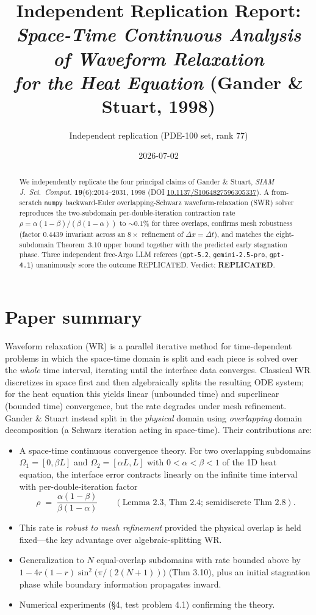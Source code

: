\documentclass[11pt]{article}
\title{Independent Replication Report:\\
\emph{Space-Time Continuous Analysis of Waveform Relaxation\\
for the Heat Equation} (Gander \& Stuart, 1998)}
\author{Independent replication (PDE-100 set, rank 77)}
\date{2026-07-02}
\begin{document}
\maketitle

\begin{abstract}
We independently replicate the four principal claims of Gander \& Stuart,
\emph{SIAM J.\ Sci.\ Comput.} \textbf{19}(6):2014--2031, 1998
(DOI \href{https://doi.org/10.1137/S1064827596305337}{10.1137/S1064827596305337}).
A from-scratch \texttt{numpy} backward-Euler overlapping-Schwarz waveform-relaxation (SWR)
solver reproduces the two-subdomain per-double-iteration contraction rate
$\rho = \alpha(1-\beta)/(\beta(1-\alpha))$ to $\sim 0.1\%$ for three overlaps,
confirms mesh robustness (factor $0.4439$ invariant across an $8\times$ refinement of
$\Delta x=\Delta t$), and matches the eight-subdomain Theorem~3.10 upper bound together
with the predicted early stagnation phase. Three independent free-Argo LLM referees
(\texttt{gpt-5.2}, \texttt{gemini-2.5-pro}, \texttt{gpt-4.1}) unanimously score the
outcome REPLICATED. Verdict: \textbf{REPLICATED}.
\end{abstract}

\section{Paper summary}
Waveform relaxation (WR) is a parallel iterative method for time-dependent problems
in which the space-time domain is split and each piece is solved over the
\emph{whole} time interval, iterating until the interface data converges. Classical
WR discretizes in space first and then algebraically splits the resulting ODE system;
for the heat equation this yields linear (unbounded time) and superlinear (bounded time)
convergence, but the rate degrades under mesh refinement. Gander \& Stuart instead
split in the \emph{physical} domain using \emph{overlapping} domain decomposition
(a Schwarz iteration acting in space-time). Their contributions are:
\begin{itemize}
\item A space-time continuous convergence theory. For two overlapping subdomains
$\Omega_1=[0,\beta L]$ and $\Omega_2=[\alpha L, L]$ with $0<\alpha<\beta<1$ of the 1D
heat equation, the interface error contracts linearly on the infinite time interval
with per-double-iteration factor
\[
\rho \;=\; \frac{\alpha(1-\beta)}{\beta(1-\alpha)}
\qquad (\text{Lemma 2.3, Thm 2.4; semidiscrete Thm 2.8}).
\]
\item This rate is \emph{robust to mesh refinement} provided the physical overlap is
held fixed---the key advantage over algebraic-splitting WR.
\item Generalization to $N$ equal-overlap subdomains with rate bounded above by
$1 - 4r(1-r)\sin^2\!\big(\pi/(2(N+1))\big)$ (Thm 3.10), plus an initial stagnation
phase while boundary information propagates inward.
\item Numerical experiments (\S 4, test problem 4.1) confirming the theory.
\end{itemize}
\end{document}
